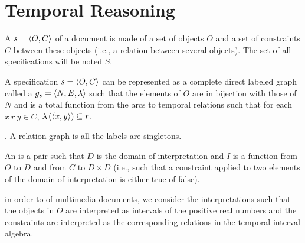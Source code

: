 \section{Temporal Reasoning}

\begin{defi}
A  $s=\left\langle O,C\right\rangle$ of a document is made of a set of objects $O$ and a set of constraints $C$ between these objects (i.e., a relation between several objects). The set of all specifications will be noted $S$.
\cite{conf/ijcai/EuzenatLD03}
\end{defi}

\begin{defi}
A specification $s=\left\langle O,C\right\rangle$ can be represented as a complete direct labeled graph called a  $g_s=\left\langle N,E,\lambda\right\rangle$ such that the elements of $O$ are in bijection with those of $N$ and  is a total function from the arcs to temporal relations such that for each $x\ r\ y\in C$, $\lambda\left(\left\langle x,y\right\rangle\right)\subseteq r$.
\cite{conf/ijcai/EuzenatLD03}
\end{defi}


\begin{defi}.
A relation graph is  \iffTx{} all the labels are singletons.
\cite{conf/ijcai/EuzenatLD03}
\end{defi}

\begin{defi}
An  is a pair  such that $D$ is the domain of interpretation and $I$ is a function from $O$ to $D$ and from $C$ to $D\times D$ (i.e., such that a constraint applied to two elements of the domain of interpretation is either true of false).
\cite{conf/ijcai/EuzenatLD03}
\end{defi}

\begin{defi}
in order to  of multimedia documents, we consider the interpretations such that the objects in $O$ are interpreted as intervals of the positive real numbers and the constraints are interpreted as the corresponding relations in the temporal interval algebra.
\cite{conf/ijcai/EuzenatLD03}
\end{defi}

